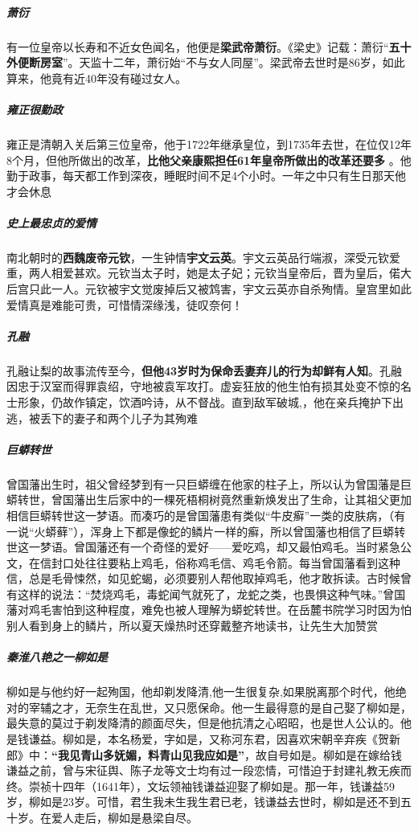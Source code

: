 \documentclass[UTF8,a4paper,12pt]{ctexbook}
\begin{document}
		\subparagraph{萧衍}有一位皇帝以长寿和不近女色闻名，他便是\textbf{梁武帝萧衍}。《梁史》记载：萧衍“\textbf{五十外便断房室}”。天监十二年，萧衍始“不与女人同屋”。梁武帝去世时是86岁，如此算来，他竟有近40年没有碰过女人。
		
		\subparagraph{雍正很勤政}雍正是清朝入关后第三位皇帝，他于1722年继承皇位，到1735年去世，在位仅12年8个月，但他所做出的改革，\textbf{比他父亲康熙担任61年皇帝所做出的改革还要多} 。他勤于政事，每天都工作到深夜，睡眠时间不足4个小时。一年之中只有生日那天他才会休息 ​​
		​​
		\subparagraph{史上最忠贞的爱情}南北朝时的\textbf{西魏废帝元钦}，一生钟情\textbf{宇文云英}。宇文云英品行端淑，深受元钦爱重，两人相爱甚欢。元钦当太子时，她是太子妃；元钦当皇帝后，晋为皇后，偌大后宫只此一人。元钦被宇文觉废掉后又被鸩害，宇文云英亦自杀殉情。皇宫里如此爱情真是难能可贵，可惜情深缘浅，徒叹奈何！
		
		\subparagraph{孔融}孔融让梨的故事流传至今，\textbf{但他43岁时为保命丢妻弃儿的行为却鲜有人知}。孔融因忠于汉室而得罪袁绍，守地被袁军攻打。虚妄狂放的他生怕有损其处变不惊的名士形象，仍故作镇定，饮酒吟诗，从不督战。直到敌军破城,，他在亲兵掩护下出逃，被丢下的妻子和两个儿子为其殉难
		
		\subparagraph{巨蟒转世}曾国藩出生时，祖父曾经梦到有一只巨蟒缠在他家的柱子上，所以认为曾国藩是巨蟒转世，曾国藩出生后家中的一棵死梧桐树竟然重新焕发出了生命，让其祖父更加相信巨蟒转世这一梦语。而凑巧的是曾国藩患有类似“牛皮癣”一类的皮肤病，（有一说“火蟒藓”），浑身上下都是像蛇的鳞片一样的癣，所以曾国藩也相信了巨蟒转世这一梦语。曾国藩还有一个奇怪的爱好——爱吃鸡，却又最怕鸡毛。当时紧急公文，在信封口处往往要粘上鸡毛，俗称鸡毛信、鸡毛令箭。每当曾国藩看到这种信，总是毛骨悚然，如见蛇蝎，必须要别人帮他取掉鸡毛，他才敢拆读。古时候曾有这样的说法：“焚烧鸡毛，毒蛇闻气就死了，龙蛇之类，也畏惧这种气味。”曾国藩对鸡毛害怕到这种程度，难免也被人理解为蟒蛇转世。在岳麓书院学习时因为怕别人看到身上的鳞片，所以夏天燥热时还穿戴整齐地读书，让先生大加赞赏

		\subparagraph{秦淮八艳之一柳如是}柳如是与他约好一起殉国，他却剃发降清,他一生很复杂,如果脱离那个时代，他绝对的宰辅之才，无奈生在乱世，又只愿保命。他一生最得意的是自己娶了柳如是，最失意的莫过于剃发降清的颜面尽失，但是他抗清之心昭昭，也是世人公认的。 ​他是钱谦益。柳如是，本名杨爱，字如是，又称河东君，因喜欢宋朝辛弃疾《贺新郎》中：\textbf{“我见青山多妩媚，料青山见我应如是”}，故自号如是。柳如是在嫁给钱谦益之前，曾与宋征舆、陈子龙等文士均有过一段恋情，可惜迫于封建礼教无疾而终。崇祯十四年（1641年），文坛领袖钱谦益迎娶了柳如是。那一年，钱谦益59岁，柳如是23岁。可惜，君生我未生我生君已老，钱谦益去世时，柳如是还不到五十岁。在爱人走后，柳如是悬梁自尽。
		
\end{document}
